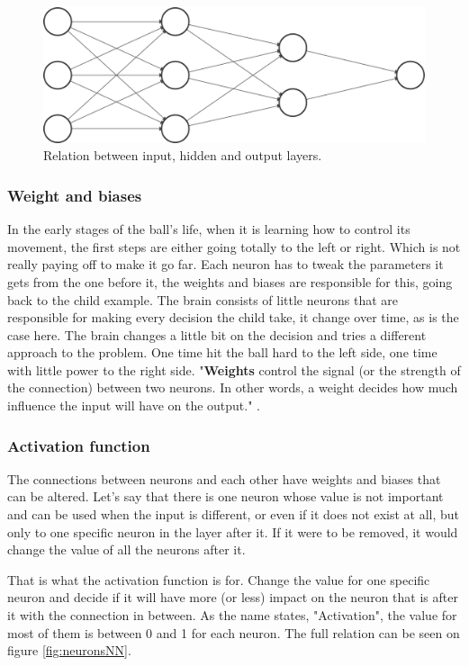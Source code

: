 \begin{figure}[H]
	\centering
	\includegraphics[width=0.7\linewidth]{usedImages/nn}
	\caption{Relation between input, hidden and output layers.}
	\label{fig:NN}
\end{figure}

\subsubsection{Weight and biases}

In the early stages of the ball's life, when it is learning how to control its movement, the first steps are either going totally to the left or right. Which is not really paying off to make it go far. Each neuron has to tweak the parameters it gets from the one before it, the weights and biases are responsible for this, going back to the child example. The brain consists of little neurons that are responsible for making every decision the child take, it change over time, as is the case here. The brain changes a little bit on the decision and tries a different approach to the problem. One time hit the ball hard to the left side, one time with little power to the right side. "\textbf{Weights} control the signal (or the strength of the connection) between two neurons. In other words, a weight decides how much influence the input will have on the output." \cite{Weights_and_Biases}.

\subsubsection{Activation function} \label{sec:activation-function}
The connections between neurons and each other have weights and biases that can be altered. Let's say that there is one neuron whose value is not important and can be used when the input is different, or even if it does not exist at all, but only to one specific neuron in the layer after it. If it were to be removed, it would change the value of all the neurons after it.

That is what the activation function is for. Change the value for one specific neuron and decide if it will have more (or less) impact on the neuron that is after it with the connection in between. As the name states, "Activation", the value for most of them is between 0 and 1 for each neuron. The full relation can be seen on figure \ref{fig:neuronsNN}.

